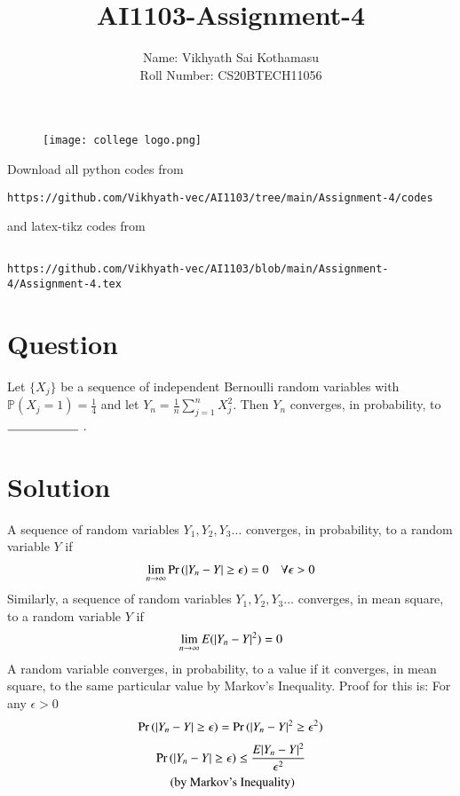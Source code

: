 \documentclass[journal,12pt,twocolumn]{IEEEtran}
\begin{document}
\title{AI1103-Assignment-4}
\author{Name: Vikhyath Sai Kothamasu\\Roll Number: CS20BTECH11056}
\maketitle
\newpage
\bigskip
\renewcommand{\thefigure}{\theenumi}
\renewcommand{\thetable}{\theenumi}

\begin{figure} [h]
    \texttt{[image: college logo.png]}
\end{figure}

Download all python codes from 
\begin{lstlisting}
https://github.com/Vikhyath-vec/AI1103/tree/main/Assignment-4/codes
\end{lstlisting}
%
and latex-tikz codes from 
%
\begin{lstlisting}

https://github.com/Vikhyath-vec/AI1103/blob/main/Assignment-4/Assignment-4.tex
\end{lstlisting}
\section*{Question}
Let $\{X_j\}$ be a sequence of independent Bernoulli random variables with $\mathbb{P}(X_j=1) = \frac{1}{4}$ and let $Y_n = \frac{1}{n} \sum_{j=1}^{n}X_j^2$. Then $Y_n$ converges, in probability, to $\rule{2cm}{0.15mm}$ .

\section*{Solution}
A sequence of random variables $Y_1,Y_2,Y_3\hdots$ converges, in probability, to a random variable $Y$ if
\begin{align}
    \lim_{n\rightarrow \infty}\Pr{(\vert Y_n-Y\vert\geq \epsilon)} = 0 \quad \forall \epsilon >0
\end{align}
Similarly, a sequence of random variables $Y_1,Y_2,Y_3\hdots$ converges, in mean square, to a random variable $Y$ if
\begin{align}
    \lim_{n\rightarrow \infty} E(\vert Y_n-Y\vert^2) = 0 
\end{align}
A random variable converges, in probability, to a value if it converges, in mean square, to the same particular value by Markov's Inequality. Proof for this is: For any $\epsilon > 0$
\begin{align}
    \Pr{(\vert Y_n-Y\vert\geq \epsilon)} = \Pr{(\vert Y_n-Y\vert^2\geq \epsilon^2)}
\end{align}
\begin{multline}
    \Pr{(\vert Y_n-Y\vert\geq \epsilon)}  \leq \frac{E\vert Y_n-Y\vert^2}{\epsilon^2} 
    \\\text{ (by Markov's Inequality)}
\end{multline}
 
\end{document}

